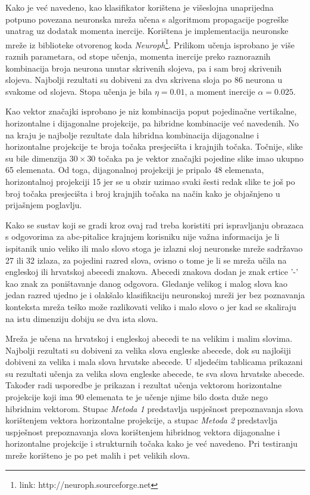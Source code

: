 Kako je već navedeno, kao klasifikator korištena je višeslojna unaprijedna potpuno povezana neuronska mreža učena s algoritmom propagacije pogreške unatrag uz dodatak momenta inercije. Korištena je implementacija neuronske mreže iz biblioteke otvorenog koda \emph{Neuroph}\footnote{link: http://neuroph.sourceforge.net}. Prilikom učenja isprobano je više raznih parametara, od stope učenja, momenta inercije preko raznoraznih kombinacija broja neurona unutar skrivenih slojeva, pa i sam broj skrivenih slojeva. Najbolji rezultati su dobiveni za dva skrivena sloja po $86$ neurona u svakome od slojeva. Stopa učenja je bila $\eta = 0.01$, a moment inercije $\alpha = 0.025$.

Kao vektor značajki isprobano je niz kombinacija poput pojedinačne vertikalne, horizontalne i dijagonalne projekcije, pa hibridne kombinacije već navedenih. No na kraju je najbolje rezultate dala hibridna kombinacija dijagonalne i horizontalne projekcije te broja točaka presjecišta i krajnjih točaka. Točnije, slike su bile dimenzija $30 \times 30$ točaka pa je vektor značajki pojedine slike imao ukupno 65 elemenata. Od toga, dijagonalnoj projekciji je pripalo 48 elemenata, horizontalnoj projekciji 15 jer se u obzir uzimao svaki šesti redak slike te još po broj točaka presjecišta i broj krajnjih točaka na način kako je objašnjeno u prijašnjem poglavlju.

Kako se sustav koji se gradi kroz ovaj rad treba koristiti pri ispravljanju obrazaca s odgovorima za abc-pitalice krajnjem korisniku nije važna informacija je li ispitanik unio veliko ili malo slovo stoga je izlazni sloj neuronske mreže sadržavao 27 ili 32 izlaza, za pojedini razred slova, ovisno o tome je li se mreža učila na engleskoj ili hrvatskoj abecedi znakova. Abecedi znakova dodan je znak crtice '-' kao znak za poništavanje danog odgovora. Gledanje velikog i malog slova kao jedan razred ujedno je i olakšalo klasifikaciju neuronskoj mreži jer bez poznavanja konteksta mreža teško može razlikovati veliko i malo slovo o jer kad se skaliraju na istu dimenziju dobiju se dva ista slova.

Mreža je učena na hrvatskoj i engleskoj abecedi te na velikim i malim slovima. Najbolji rezultati su dobiveni za velika slova engleske abecede, dok su najlošiji dobiveni za velika i mala slova hrvatske abecede. U sljedećim tablicama prikazani su rezultati učenja za velika slova engleske abecede, te sva slova hrvatske abecede. Također radi usporedbe je prikazan i rezultat učenja vektorom horizontalne projekcije koji ima 90 elemenata te je učenje njime bilo dosta duže nego hibridnim vektorom. Stupac \emph{Metoda 1} predstavlja uspješnost prepoznavanja slova korištenjem vektora horizontalne projekcije, a stupac \emph{Metoda 2} predstavlja uspješnost prepoznavanja slova korištenjem hibridnog vektora dijagonalne i horizontalne projekcije i strukturnih točaka kako je već navedeno.  Pri testiranju mreže korišteno je po pet malih i pet velikih slova.

